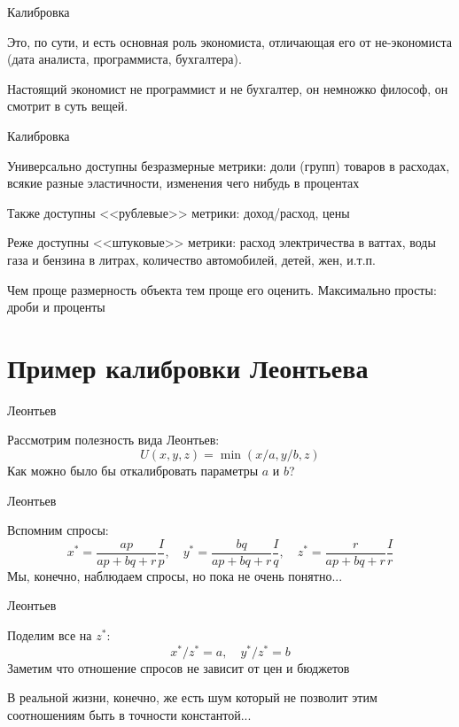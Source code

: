 \documentclass{beamer}
\begin{document}
\begin{frame}{Калибровка}

Это, по сути, и есть основная роль экономиста, отличающая его от не-экономиста (дата аналиста, программиста, бухгалтера). 

\alert{Настоящий экономист} не программист и не бухгалтер, он немножко философ, он \alert{смотрит в суть вещей}.

\end{frame}

\begin{frame}{Калибровка}

Универсально доступны безразмерные метрики: доли (групп) товаров в расходах, всякие разные эластичности, изменения чего нибудь в процентах

Также доступны <<рублевые>> метрики: доход/расход, цены

Реже доступны <<штуковые>> метрики: расход электричества в ваттах, воды газа и бензина в литрах, количество автомобилей, детей, жен, и.т.п.

Чем проще размерность объекта тем проще его оценить. Максимально просты: дроби и проценты

\end{frame}

\section{Пример калибровки Леонтьева}

\begin{frame}{Леонтьев}

Рассмотрим полезность вида Леонтьев:
$$ U(x,y,z) = \min(x/a,y/b,z)$$
Как можно было бы откалибровать параметры $a$ и $b$?

\end{frame}

\begin{frame}{Леонтьев}

Вспомним спросы: 
$$ x^{\ast} = \frac{ap}{ap+bq+r}\frac{I}{p}, \quad y^{\ast} = \frac{bq}{ap+bq+r}\frac{I}{q}, \quad z^{\ast} = \frac{r}{ap+bq+r}\frac{I}{r}$$
Мы, конечно, наблюдаем спросы, но пока не очень понятно...
\end{frame}

\begin{frame}{Леонтьев}

Поделим все на $z^{\ast}$:
$$ x^{\ast}/z^{\ast} = a, \quad y^{\ast}/z^{\ast} = b$$
Заметим что отношение спросов не зависит от цен и бюджетов

В реальной жизни, конечно, же есть шум который не позволит этим соотношениям быть в точности константой...
\end{frame}
\end{document}
